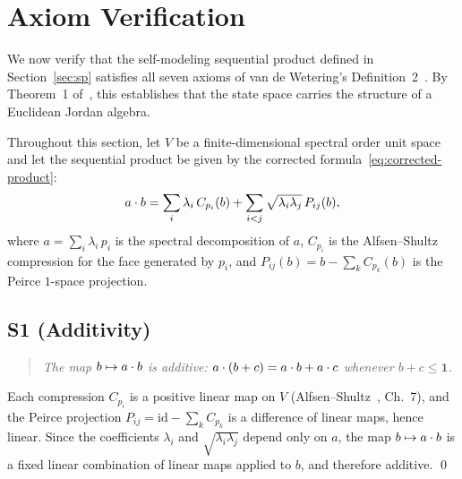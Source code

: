 
\section{Axiom Verification}\label{sec:axioms}

We now verify that the self-modeling sequential product defined in
Section~\ref{sec:sp} satisfies all seven axioms of van de
Wetering's Definition~2~\cite{vandeWetering2019b}. By Theorem~1 of~\cite{vandeWetering2019b},
this establishes that the state space carries the structure of a Euclidean
Jordan algebra.

Throughout this section, let $V$ be a finite-dimensional spectral order
unit space and let the sequential product be given by the corrected
formula~\eqref{eq:corrected-product}:
\begin{equation}\label{eq:sp-explicit}
  \sp{a}{b}
  = \sum_i \lambda_i\, C_{p_i}(b)
  + \sum_{i<j} \sqrt{\lambda_i \lambda_j}\, P_{ij}(b),
\end{equation}
where $a = \sum_i \lambda_i\, p_i$ is the spectral decomposition of $a$,
$C_{p_i}$ is the Alfsen--Shultz compression for the face generated by
$p_i$, and $P_{ij}(b) = b - \sum_k C_{p_k}(b)$ is the Peirce $1$-space
projection.

\subsection*{S1 (Additivity)}

\begin{quote}
\emph{The map $b \mapsto \sp{a}{b}$ is additive:
$\sp{a}{(b+c)} = \sp{a}{b} + \sp{a}{c}$
whenever $b + c \le \mathbf{1}$.}
\end{quote}

Each compression $C_{p_i}$ is a positive linear map on $V$
(Alfsen--Shultz~\cite{AlfsenShultz2003}, Ch.~7), and the Peirce
projection $P_{ij} = \mathrm{id} - \sum_k C_{p_k}$ is a difference of
linear maps, hence linear. Since the coefficients $\lambda_i$ and
$\sqrt{\lambda_i\lambda_j}$ depend only on $a$, the map $b \mapsto
\sp{a}{b}$ is a fixed linear combination of linear maps applied to $b$,
and therefore additive. \qed

